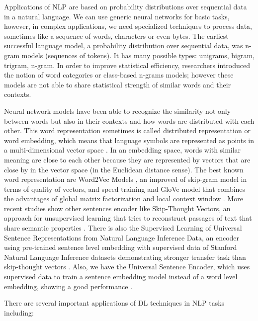 \documentclass[12pt]{report}
\begin{document}
Applications of \ac{NLP} are based on probability distributions over sequential data in a natural language. We can use generic neural networks for basic tasks, however, in complex applications, we need specialized techniques to process data, sometimes like a sequence of words, characters or even bytes. The earliest successful language model, a probability distribution over sequential data, was n-gram models (sequences of tokens). It has many possible types: unigrams, bigram, trigram, n-gram. In order to improve statistical efficiency, researchers introduced the notion of word categories or class-based n-grams models; however these models are not able to share statistical strength of similar words and their contexts. 

Neural network  models have been able to recognize the similarity not only between words but also in their contexts and how words are distributed with each other. This word representation sometimes is called  distributed representation or word embedding, which means that language symbols are represented as points in a multi-dimensional vector space . In an embedding space, words with similar meaning are close to each other \cite{Russell2010,Goodfellow2016} because they are represented by vectors that are close by in the vector space (in the Euclidean distance sense). The best known word representation are Word2Vec Models \cite{Mikolov2013}, an improved of skip-gram model in terms of quality of vectors, and speed training \cite{Mikolov2013} and GloVe model that combines the advantages of global matrix factorization and local context window \cite{Pennington2014}. More recent studies show other sentences encoder like Skip-Thought Vectors, an approach for unsupervised learning that tries to reconstruct passages of text that share semantic properties \cite{Kiros2015}. There is also the  Supervised Learning of Universal Sentence Representations from Natural Language Inference Data, an encoder using pre-trained sentence level embedding with supervised data of Stanford Natural Language Inference datasets demonstrating stronger transfer task than skip-thought vectors \cite{ Conneau2017}. Also, we have the Universal Sentence Encoder, which uses supervised data to train a sentence embedding model instead of a word level embedding, showing a good performance \cite{Cer2018}. 

There are several important applications of \ac{DL} techniques in \ac{NLP} tasks including:
\end{document}
